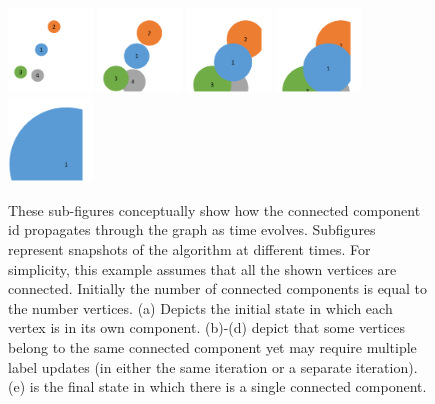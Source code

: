 \begin{figure}

\includegraphics[width=0.2\textwidth]{figure/sv1}
\includegraphics[width=0.2\textwidth]{figure/sv2}
\includegraphics[width=0.2\textwidth]{figure/sv3}
\includegraphics[width=0.2\textwidth]{figure/sv4}
\includegraphics[width=0.2\textwidth]{figure/sv5}
\caption{
\label{fig:svalgm}
These sub-figures conceptually show how the connected component id
propagates through the graph as time evolves. Subfigures represent
snapshots of the algorithm at different times. For simplicity, this
example assumes that all the shown vertices are connected. Initially
the number of connected components is equal to the number vertices.
(a) Depicts the initial state in which each vertex is in its own component.
(b)-(d) depict that some vertices belong to the same connected component
yet may require multiple label updates (in either the same iteration
or a separate iteration). (e) is the final state in which there is
a single connected component.}

\end{figure}

